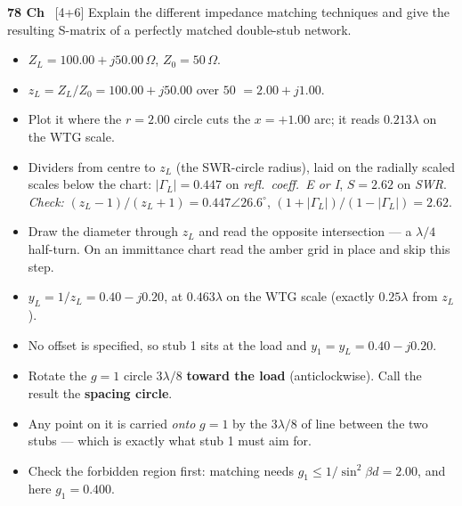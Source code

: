 \begin{asked}{\textbf{78 Ch} \ [4+6]}
Explain the different impedance matching techniques and give the resulting S-matrix of a perfectly matched double-stub network.
\end{asked}
\begin{itemize}
  \item $Z_L = 100.00 + j50.00\,\Omega$, $Z_0 = 50\,\Omega$.
\end{itemize}
\begin{itemize}
  \item $z_L = Z_L/Z_0 = 100.00 + j50.00$ over $50$ $=2.00 + j1.00$.
  \item Plot it where the $r = 2.00$ circle cuts the $x = +1.00$ arc; it reads $0.213\lambda$ on the WTG scale.
  \item Dividers from centre to $z_L$ (the SWR-circle radius), laid on the radially scaled scales below the chart: $|\Gamma_L| = 0.447$ on \emph{refl.\ coeff.\ E or I}, $S = 2.62$ on \emph{SWR}. \textit{Check:} $(z_L-1)/(z_L+1) = 0.447\angle 26.6^\circ$, $(1+|\Gamma_L|)/(1-|\Gamma_L|) = 2.62$.
\end{itemize}
\begin{itemize}
  \item Draw the diameter through $z_L$ and read the opposite intersection --- a $\lambda/4$ half-turn. On an immittance chart read the amber grid in place and skip this step.
  \item $y_L = 1/z_L = 0.40 - j0.20$, at $0.463\lambda$ on the WTG scale (exactly $0.25\lambda$ from $z_L$).
\end{itemize}
\begin{itemize}
  \item No offset is specified, so stub 1 sits at the load and $y_1 = y_L = 0.40 - j0.20$.
\end{itemize}
\begin{itemize}
  \item Rotate the $g=1$ circle $3\lambda/8$ \textbf{toward the load} (anticlockwise). Call the result the \textbf{spacing circle}.
  \item Any point on it is carried \emph{onto} $g=1$ by the $3\lambda/8$ of line between the two stubs --- which is exactly what stub 1 must aim for.
  \item Check the forbidden region first: matching needs $g_1 \le 1/\sin^2\beta d = 2.00$, and here $g_1 = 0.400$. \checkmark
\end{itemize}
